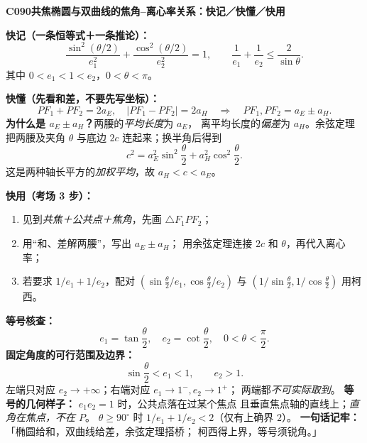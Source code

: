 \clearpage
\begin{summarybox}
\textbf{C090\quad 共焦椭圆与双曲线的焦角--离心率关系：快记／快懂／快用}

\textbf{快记（一条恒等式＋一条推论）：}
\[
 \boxed{\frac{\sin^2(\theta/2)}{e_1^2}+
 \frac{\cos^2(\theta/2)}{e_2^2}=1},\qquad
 \boxed{\frac1{e_1}+\frac1{e_2}\le\frac2{\sin\theta}}.
\]
其中 $0<e_1<1<e_2$，$0<\theta<\pi$。

\textbf{快懂（先看和差，不要先写坐标）：}
\[
 PF_1+PF_2=2a_E,\quad |PF_1-PF_2|=2a_H
 \quad\Longrightarrow\quad PF_1,PF_2=a_E\pm a_H.
\]
\textbf{为什么是 $a_E\pm a_H$？}两腰的\emph{平均长度}为 $a_E$，
离平均长度的\emph{偏差}为 $a_H$。余弦定理把两腰及夹角
$\theta$ 与底边 $2c$ 连起来；换半角后得到
\[
c^2=a_E^2\sin^2\frac\theta2+a_H^2\cos^2\frac\theta2.
\]
这是两种轴长平方的\emph{加权平均}，故 $a_H<c<a_E$。

\textbf{快用（考场 3 步）：}
\begin{enumerate}
\item 见到\emph{共焦＋公共点＋焦角}，先画 $\triangle F_1PF_2$；
\item 用“和、差解两腰”，写出 $a_E\pm a_H$；
用余弦定理连接 $2c$ 和 $\theta$，再代入离心率；
\item 若要求 $1/e_1+1/e_2$，配对
$(\sin\frac\theta2/e_1,\cos\frac\theta2/e_2)$ 与
$(1/\sin\frac\theta2,1/\cos\frac\theta2)$ 用柯西。
\end{enumerate}

\textbf{等号核查：}
\[
 \boxed{e_1=\tan\frac\theta2,\quad e_2=\cot\frac\theta2,
 \quad0<\theta<\frac\pi2}.
\]
\textbf{固定角度的可行范围及边界：}
\[
\boxed{\sin\frac\theta2<e_1<1},\qquad e_2>1.
\]
左端只对应 $e_2\to+\infty$；右端对应 $e_1\to1^-,e_2\to1^+$；
两端都\emph{不可实际取到}。
\textbf{等号的几何样子：} $e_1e_2=1$ 时，公共点落在过某个焦点
且垂直焦点轴的直线上；\emph{直角在焦点，不在 $P$}。
$\theta\ge90^\circ$ 时 $1/e_1+1/e_2<2$（仅有上确界 $2$）。
\textbf{一句话记牢：}「椭圆给和，双曲线给差，余弦定理搭桥；
柯西得上界，等号须锐角。」
\end{summarybox}
